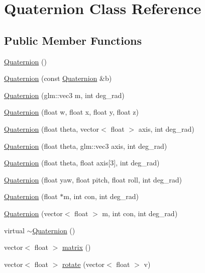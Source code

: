\hypertarget{classQuaternion}{\section{Quaternion Class Reference}
\label{classQuaternion}
}
\subsection*{Public Member Functions}
\begin{DoxyCompactItemize}
\item 
\hyperlink{classQuaternion_abcc01358aada56ea5f0db4da18aaf77d}{Quaternion} ()
\item 
\hyperlink{classQuaternion_a84c0cdc8392ec36aeb2679450a62210c}{Quaternion} (const \hyperlink{classQuaternion}{Quaternion} \&b)
\item 
\hyperlink{classQuaternion_a21e79c69edf08f4a22d634cbff8aa457}{Quaternion} (glm\-::vec3 m, int deg\-\_\-rad)
\item 
\hyperlink{classQuaternion_ab13d6ced50c96438115b30cb91fc7d6c}{Quaternion} (float w, float x, float y, float z)
\item 
\hyperlink{classQuaternion_afe6d67aea9571b86269759a5dcbbd5b1}{Quaternion} (float theta, vector$<$ float $>$ axis, int deg\-\_\-rad)
\item 
\hyperlink{classQuaternion_a9e5ad1650f41df892911653e6e4fc05c}{Quaternion} (float theta, glm\-::vec3 axis, int deg\-\_\-rad)
\item 
\hyperlink{classQuaternion_a951d6f03907e0fd81f87a821aa65eed1}{Quaternion} (float theta, float axis\mbox{[}3\mbox{]}, int deg\-\_\-rad)
\item 
\hyperlink{classQuaternion_af2d1bdc0d28bb9630259514d34a89b13}{Quaternion} (float yaw, float pitch, float roll, int deg\-\_\-rad)
\item 
\hyperlink{classQuaternion_a5caa2f853088db9a9ae4920afb907461}{Quaternion} (float $\ast$m, int con, int deg\-\_\-rad)
\item 
\hyperlink{classQuaternion_a458226b80dece68afe44fcd5cc460ae0}{Quaternion} (vector$<$ float $>$ m, int con, int deg\-\_\-rad)
\item 
virtual \hyperlink{classQuaternion_a5f834c2ca469cd71edc8a23fdc3f56e8}{$\sim$\-Quaternion} ()
\item 
vector$<$ float $>$ \hyperlink{classQuaternion_a10c72e67c80150f4419be5a616575ca4}{matrix} ()
\item 
vector$<$ float $>$ \hyperlink{classQuaternion_aff3eac8f2ff148c399fa39e16594ce1f}{rotate} (vector$<$ float $>$ v)

\end{DoxyCompactItemize}
